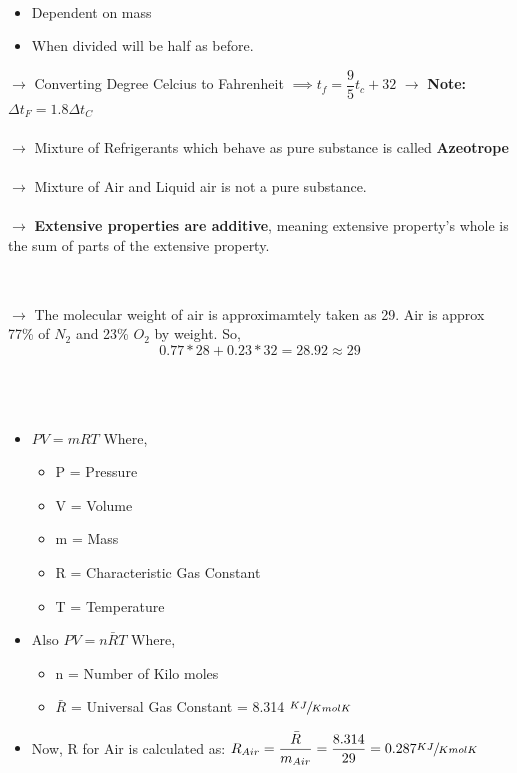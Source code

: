 \documentclass[8pt]{article}
\begin{document}
\\
	\begin{itemize}
		\item Dependent on mass
		\item When divided will be half as before. 
	\end{itemize}
$\rightarrow$ Converting Degree Celcius to Fahrenheit $\implies\boxed{t_f = \dfrac{9}{5}t_c+32}$
$\rightarrow$ \textbf{Note:} $\boxed{\Delta t_F = 1.8\Delta t_C}$\\\\
$\rightarrow$ Mixture of Refrigerants which behave as pure substance is called \textbf{Azeotrope}\\\\
$\rightarrow$ Mixture of Air and Liquid air is not a pure substance.\\\\
$\rightarrow$ \textbf{Extensive properties are additive}, meaning extensive property's whole is the sum of parts of the extensive property.\\\\
\hrulefill
\begin{center}
\subsection*{}
\end{center}
$\rightarrow$ The molecular weight of air is approximamtely taken as 29. Air is approx 77\% of $N_2$ and 23\% $O_2$ by weight. So,
$$\boxed{0.77 * 28 + 0.23 * 32 = 28.92 \approx 29}$$\\
\\\\
	\begin{itemize}
		\item $PV = mRT$ Where,
		\begin{itemize}
			\item P = Pressure
			\item V = Volume 
			\item m = Mass 
			\item R = Characteristic Gas Constant
			\item T = Temperature
		\end{itemize}
		\item Also $PV = n\bar{R}T$ Where,
		\begin{itemize}
			\item n = Number of Kilo moles
			\item $\bar{R}$ = Universal Gas Constant = 8.314 $\sfrac{KJ}{Kmol K}$			
		\end{itemize}
		\item Now, R for Air is calculated as: $R_{Air} = \dfrac{\bar{R}}{m_{Air}} = \dfrac{8.314}{29} = 0.287 \sfrac{KJ}{Kmol K}$
	\end{itemize}
\end{document}

